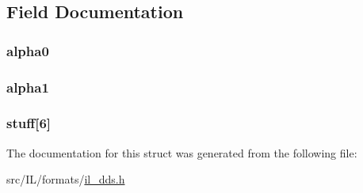 \subsection{Field Documentation}
\hypertarget{struct_d_x_t_alpha_block3_bit_linear_a2fced5a7ec405e94bb3e753bdbf47748}{
\subsubsection[{alpha0}]{ alpha0}}\label{struct_d_x_t_alpha_block3_bit_linear_a2fced5a7ec405e94bb3e753bdbf47748}
\hypertarget{struct_d_x_t_alpha_block3_bit_linear_af71fbe6e2c61e196b03d255ac7b8ed1f}{
\subsubsection[{alpha1}]{ alpha1}}\label{struct_d_x_t_alpha_block3_bit_linear_af71fbe6e2c61e196b03d255ac7b8ed1f}
\hypertarget{struct_d_x_t_alpha_block3_bit_linear_ac6a10604ccd8d03085ad4eac3240b4c8}{
\subsubsection[{stuff}]{ stuff\mbox{[}6\mbox{]}}}\label{struct_d_x_t_alpha_block3_bit_linear_ac6a10604ccd8d03085ad4eac3240b4c8}


The documentation for this struct was generated from the following file\-:\begin{DoxyCompactItemize}
\item 
src/\-I\-L/formats/\hyperlink{il__dds_8h}{il\-\_\-dds.\-h}\end{DoxyCompactItemize}
